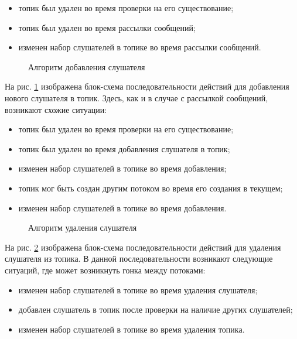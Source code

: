 \begin{itemize}  
	\item топик был удален во время проверки на его существование;
	\item топик был удален во время рассылки сообщений;
	\item изменен набор слушателей в топике во время рассылки сообщений.
\end{itemize}

\begin{figure}[h]
	\caption{Алгоритм добавления слушателя}
	\label{im:2_2_4_add_listener}
\end{figure}


На рис. \ref{im:2_2_4_add_listener} изображена блок-схема последовательности действий для добавления нового слушателя в топик. Здесь, как и в случае с рассылкой сообщений, возникают схожие ситуации:

\begin{itemize}  
	\item топик был удален во время проверки на его существование;
	\item топик был удален во время добавления слушателя в топик;
	\item изменен набор слушателей в топике во время добавления;
	\item топик мог быть создан другим потоком во время его создания в текущем;
	\item изменен набор слушателей в топике во время добавления.
\end{itemize}

\begin{figure}[h]
	\caption{Алгоритм удаления слушателя}
	\label{im:2_2_6_remove_listener}
\end{figure}

На рис. \ref{im:2_2_6_remove_listener} изображена блок-схема последовательности действий для удаления слушателя из топика. В данной последовательности возникают следующие ситуаций, где может возникнуть гонка между потоками:

\begin{itemize}
	\item изменен набор слушателей в топике во время удаления слушателя;
	\item добавлен слушатель в топик после проверки на наличие других слушателей;
	\item изменен набор слушателей в топике во время удаления топика.
\end{itemize}

